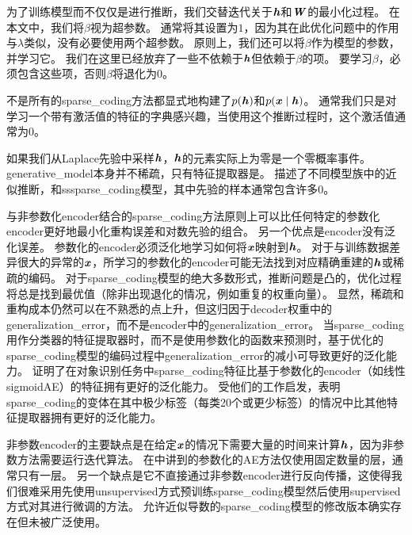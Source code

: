 为了训练模型而不仅仅是进行推断，我们交替迭代关于$\boldsymbol{\mathit{h}}$和$\boldsymbol{\mathit{W}}$的最小化过程。
在本文中，我们将$\beta$视为超参数。
通常将其设置为$1$，因为其在此优化问题中的作用与$\lambda$类似，没有必要使用两个超参数。 
原则上，我们还可以将$\beta$作为模型的参数，并学习它。
我们在这里已经放弃了一些不依赖于$\boldsymbol{\mathit{h}}$但依赖于$\beta$的项。
要学习$\beta$，必须包含这些项，否则$\beta$将退化为$0$。


不是所有的\gls{sparse_coding}方法都显式地构建了$p(\boldsymbol{\mathit{h}})$和$p(\boldsymbol{\mathit{x}}\mid\boldsymbol{\mathit{h}})$。 
通常我们只是对学习一个带有激活值的特征的字典感兴趣，当使用这个推断过程时，这个激活值通常为$0$。

如果我们从Laplace先验中采样$\boldsymbol{\mathit{h}}$，$\boldsymbol{\mathit{h}}$的元素实际上为零是一个零概率事件。
\gls{generative_model}本身并不稀疏，只有特征提取器是。
\citet{Goodfeli-et-al-TPAMI-Deep-PrePrint-2013-small}描述了不同模型族中的近似推断，和\gls{ss}\gls{sparse_coding}模型，其中先验的样本通常包含许多0。

与非参数化\gls{encoder}结合的\gls{sparse_coding}方法原则上可以比任何特定的参数化\gls{encoder}更好地最小化重构误差和对数先验的组合。
另一个优点是\gls{encoder}没有泛化误差。
参数化的\gls{encoder}必须泛化地学习如何将$\boldsymbol{\mathit{x}}$映射到$\boldsymbol{\mathit{h}}$。
对于与训练数据差异很大的异常的$\boldsymbol{\mathit{x}}$，所学习的参数化的\gls{encoder}可能无法找到对应精确重建的$\boldsymbol{\mathit{h}}$或稀疏的编码。
对于\gls{sparse_coding}模型的绝大多数形式，推断问题是凸的，优化过程将总是找到最优值（除非出现退化的情况，例如重复的权重向量）。
显然，稀疏和重构成本仍然可以在不熟悉的点上升，但这归因于\gls{decoder}权重中的\gls{generalization_error}，而不是\gls{encoder}中的\gls{generalization_error}。
当\gls{sparse_coding}用作分类器的特征提取器时，而不是使用参数化的函数来预测时，基于优化的\gls{sparse_coding}模型的编码过程中\gls{generalization_error}的减小可导致更好的泛化能力。
\citet{Coates2011b}证明了在对象识别任务中\gls{sparse_coding}特征比基于参数化的\gls{encoder}（如线性\gls{sigmoid}\gls{AE}）的特征拥有更好的泛化能力。
受他们的工作启发，\citet{Goodfeli-et-al-TPAMI-Deep-PrePrint-2013-small}表明\gls{sparse_coding}的变体在其中极少标签（每类20个或更少标签）的情况中比其他特征提取器拥有更好的泛化能力。



非参数\gls{encoder}的主要缺点是在给定$\boldsymbol{\mathit{x}}$的情况下需要大量的时间来计算$\boldsymbol{\mathit{h}}$，因为非参数方法需要运行迭代算法。
在中讲到的参数化的\gls{AE}方法仅使用固定数量的层，通常只有一层。
另一个缺点是它不直接通过非参数\gls{encoder}进行反向传播，这使得我们很难采用先使用\gls{unsupervised}方式预训练\gls{sparse_coding}模型然后使用\gls{supervised}方式对其进行微调的方法。
允许近似导数的\gls{sparse_coding}模型的修改版本确实存在但未被广泛使用\citep{Bradley+Bagnell-2009-small}。

